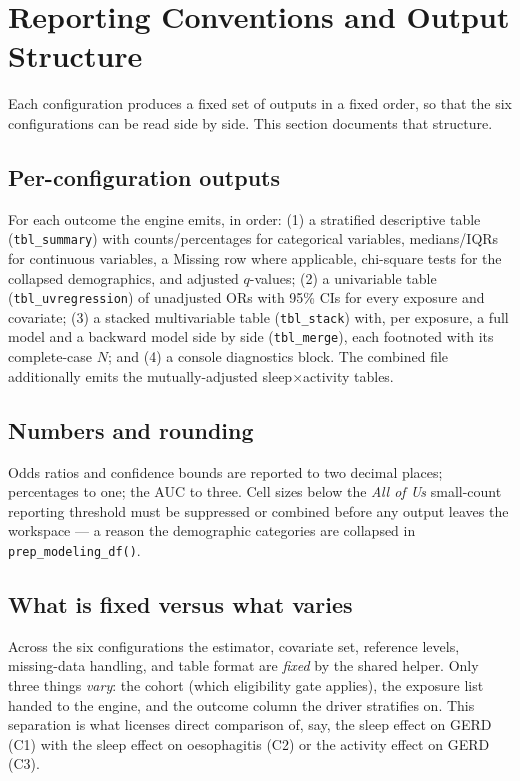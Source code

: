 \documentclass[11pt]{article}
\newcommand{\code}[1]{\texttt{\small #1}}
\begin{document}
\section{Reporting Conventions and Output Structure}
Each configuration produces a fixed set of outputs in a fixed order, so that the six configurations can
be read side by side. This section documents that structure.

\subsection{Per-configuration outputs}
For each outcome the engine emits, in order: (1) a stratified descriptive table
(\code{tbl_summary}) with counts/percentages for categorical variables, medians/IQRs for continuous
variables, a Missing row where applicable, chi-square tests for the collapsed demographics, and adjusted
$q$-values; (2) a univariable table (\code{tbl_uvregression}) of unadjusted ORs with 95\% CIs for every
exposure and covariate; (3) a stacked multivariable table (\code{tbl_stack}) with, per exposure, a full
model and a backward model side by side (\code{tbl_merge}), each footnoted with its complete-case $N$;
and (4) a console diagnostics block. The combined file additionally emits the mutually-adjusted
sleep$\times$activity tables.

\subsection{Numbers and rounding}
Odds ratios and confidence bounds are reported to two decimal places; percentages to one; the AUC to
three. Cell sizes below the \emph{All of Us} small-count reporting threshold must be suppressed or
combined before any output leaves the workspace --- a reason the demographic categories are collapsed
in \code{prep_modeling_df()}.

\subsection{What is fixed versus what varies}
Across the six configurations the estimator, covariate set, reference levels, missing-data handling,
and table format are \emph{fixed} by the shared helper. Only three things \emph{vary}: the cohort (which
eligibility gate applies), the exposure list handed to the engine, and the outcome column the driver
stratifies on. This separation is what licenses direct comparison of, say, the sleep effect on GERD (C1)
with the sleep effect on oesophagitis (C2) or the activity effect on GERD (C3).
\end{document}
